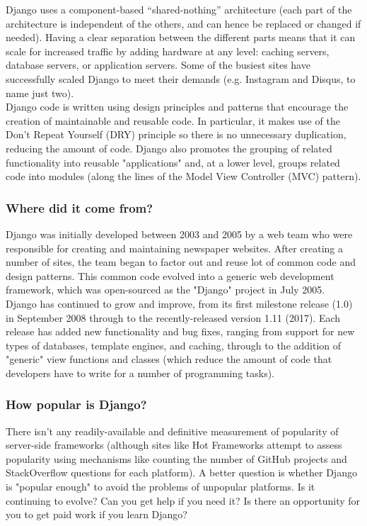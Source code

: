 Django uses a component-based “shared-nothing” architecture (each part of the architecture is independent of the others, and can hence be replaced or changed if needed). Having a clear separation between the different parts means that it can scale for increased traffic by adding hardware at any level: caching servers, database servers, or application servers. Some of the busiest sites have successfully scaled Django to meet their demands (e.g. Instagram and Disqus, to name just two).\\
Django code is written using design principles and patterns that encourage the creation of maintainable and reusable code. In particular, it makes use of the Don't Repeat Yourself (DRY) principle so there is no unnecessary duplication, reducing the amount of code. Django also promotes the grouping of related functionality into reusable "applications" and, at a lower level, groups related code into modules (along the lines of the Model View Controller (MVC) pattern).\\
\subsubsection{Where did it come from?}
Django was initially developed between 2003 and 2005 by a web team who were responsible for creating and maintaining newspaper websites. After creating a number of sites, the team began to factor out and reuse lot of common code and design patterns. This common code evolved into a generic web development framework, which was open-sourced as the "Django" project in July 2005. \\

Django has continued to grow and improve, from its first milestone release (1.0) in September 2008 through to the recently-released version 1.11 (2017). Each release has added new functionality and bug fixes, ranging from support for new types of databases, template engines, and caching, through to the addition of "generic" view functions and classes (which reduce the amount of code that developers have to write for a number of programming tasks). \\
\subsubsection{How popular is Django?}
There isn't any readily-available and definitive measurement of popularity of server-side frameworks (although sites like Hot Frameworks attempt to assess popularity using mechanisms like counting the number of GitHub projects and StackOverflow questions for each platform). A better question is whether Django is "popular enough" to avoid the problems of unpopular platforms. Is it continuing to evolve? Can you get help if you need it? Is there an opportunity for you to get paid work if you learn Django?\\ 

